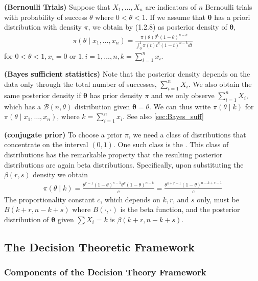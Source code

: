 \documentclass{article}
\newcommand{\bfs}[1]{\textbf{({#1}) }}
\begin{document}
\begin{exma}\bfs{Bernoulli Trials}\label{ex:ber_trial0}
Suppose that $X_{1}, \ldots, X_{n}$ are indicators of $n$ Bernoulli trials with probability of success $\theta$ where $0<\theta<1$. If we assume that $\boldsymbol{\theta}$ has a priori distribution with density $\pi$, we obtain by (1.2.8) as posterior density of $\boldsymbol{\theta}$,
\begin{align*}
\pi\left(\theta \mid x_{1}, \ldots, x_{n}\right)=\frac{\pi(\theta) \theta^{k}(1-\theta)^{n-k}}{\int_{0}^{1} \pi(t) t^{k}(1-t)^{n-k} d t}
\end{align*}
for $0<\theta<1, x_{i}=0$ or $1, i=1, \ldots, n, k=\sum_{i=1}^{n} x_{i}$.
\end{exma} 
\begin{rema}\bfs{Bayes sufficient statistics}
Note that the posterior density depends on the data only through the total number of successes, $\sum_{i=1}^{n} X_{i}$. We also obtain the same posterior density if $\boldsymbol{\theta}$ has prior density $\pi$ and we only observe $\sum_{i=1}^{n} X_{i}$, which has a $\mathcal{B}(n, \theta)$ distribution given $\boldsymbol{\theta}=\theta$. We can thus write $\pi(\theta \mid k)$ for $\pi\left(\theta \mid x_{1}, \ldots, x_{n}\right)$, where $k=\sum_{i=1}^{n} x_{i}$. See also \cref{sec:Bayes_suff}
\end{rema}
\begin{rema}\bfs{conjugate prior}\label{re:conju_beta}
To choose a prior $\pi$, we need a class of distributions that concentrate on the interval $(0,1)$. One such class is the . This class of distributions has the remarkable property that the resulting posterior distributions are again beta distributions. Specifically, upon substituting the $\beta(r, s)$ density we obtain
\begin{align*}
\pi(\theta \mid k)=\frac{\theta^{r-1}(1-\theta)^{s-1} \theta^{k}(1-\theta)^{n-k}}{c}=\frac{\theta^{k+r-1}(1-\theta)^{n-k+s-1}}{c}
\end{align*}
The proportionality constant $c$, which depends on $k, r$, and $s$ only, must  be $B(k+r, n-k+s)$ where $B(\cdot, \cdot)$ is the beta function, and the posterior distribution of $\boldsymbol{\theta}$ given $\sum X_{i}=k$ is $\beta(k+r, n-k+s)$.
\end{rema}
\subsection{The Decision Theoretic Framework}
\subsubsection{Components of the Decision Theory Framework}
\end{document}
